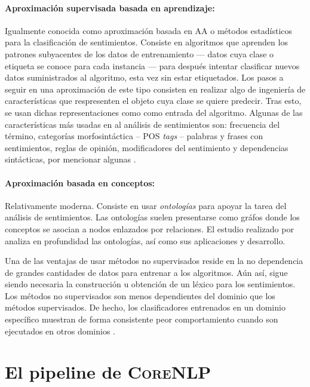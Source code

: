 \paragraph{Aproximación supervisada basada en aprendizaje:}Igualmente conocida
como aproximación basada en \ac{AA} o métodos estadísticos para la clasificación
de sentimientos. Consiste en algoritmos que aprenden los patrones subyacentes de
los datos de entrenamiento --- datos cuya clase o etiqueta se conoce para cada
instancia --- para después intentar clasificar nuevos datos suministrados al
algoritmo, esta vez sin estar etiquetados. Los pasos a seguir en una
aproximación de este tipo consisten en realizar algo de ingeniería de
características que respresenten el objeto cuya clase se quiere predecir. Tras
esto, se usan dichas representaciones como como entrada del algoritmo. Algunas
de las características más usadas en al análisis de sentimientos son: frecuencia
del término, categorías morfosintáctica -- \ac{POS} \emph{tags} -- palabras y
frases con sentimientos, reglas de opinión,  modificadores del sentimiento y
dependencias sintácticas, por mencionar algunas \cite{Liu2012}.

\paragraph{Aproximación basada en conceptos:}Relativamente moderna. Consiste en
usar \emph{ontologías} para apoyar la tarea del
análisis de sentimientos. Las ontologías suelen presentarse como gráfos donde
los conceptos se asocian a nodos enlazados por relaciones. El estudio realizado
por \citet{Zhou2007} analiza en profundidad las ontologías, así como sus
aplicaciones y desarrollo.

Una de las ventajas de usar métodos no supervisados reside en la no dependencia
de grandes cantidades de datos para entrenar a los algoritmos. Aún así, sigue
siendo necesaria la construcción u obtención de un léxico para los
sentimientos. Los métodos no supervisados son menos dependientes del dominio que
los métodos supervisados. De hecho, los clasificadores entrenados en un dominio
específico muestran de forma consistente peor comportamiento cuando son
ejecutados en otros dominios \cite{anthony2005}.


\section{El pipeline de \textsc{CoreNLP}}
\label{sec:corenlppipeline}

